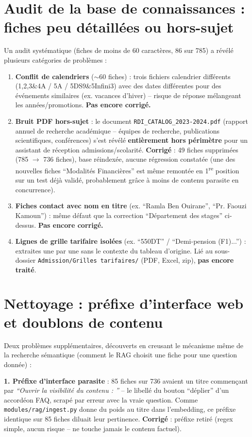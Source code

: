 \documentclass[11pt,a4paper]{report}
\begin{document}
\section{Audit de la base de connaissances : fiches peu détaillées ou hors-sujet}
Un audit systématique (fiches de moins de 60 caractères, 86 sur 785) a révélé plusieurs
catégories de problèmes :
\begin{enumerate}
    \item \textbf{Conflit de calendriers} ($\sim$60 fiches) : trois fichiers calendrier
    différents (1,2,3\&4A / 5A / 5DS9\&5Infini3) avec des dates différentes pour des
    événements similaires (ex. vacances d'hiver) -- risque de réponse mélangeant les
    années/promotions. \textbf{Pas encore corrigé.}
    \item \textbf{Bruit PDF hors-sujet} : le document \texttt{RDI\_CATALOG\_2023-2024.pdf}
    (rapport annuel de recherche académique -- équipes de recherche, publications
    scientifiques, conférences) s'est révélé \textbf{entièrement hors périmètre} pour un
    assistant de réception admissions/scolarité. \textbf{Corrigé} : 49 fiches supprimées
    (785 $\to$ 736 fiches), base réindexée, aucune régression constatée (une des
    nouvelles fiches ``Modalités Financières'' est même remontée en 1\textsuperscript{re}
    position sur un test déjà validé, probablement grâce à moins de contenu parasite en
    concurrence).
    \item \textbf{Fiches contact avec nom en titre} (ex. ``Ramla Ben Ouirane'', ``Pr.
    Faouzi Kamoun'') : même défaut que la correction ``Département des stages''
    ci-dessus. \textbf{Pas encore corrigé.}
    \item \textbf{Lignes de grille tarifaire isolées} (ex. ``550DT'' / ``Demi-pension
    (F1)...'') : extraites une par une sans le contexte du tableau d'origine. Lié au
    sous-dossier \texttt{Admission/Grilles tarifaires/} (PDF, Excel, zip), \textbf{pas
    encore traité}.
\end{enumerate}

\section{Nettoyage : préfixe d'interface web et doublons de contenu}
Deux problèmes supplémentaires, découverts en creusant le mécanisme même de la
recherche sémantique (comment le RAG choisit une fiche pour une question donnée) :

\textbf{1. Préfixe d'interface parasite} : 85 fiches sur 736 avaient un titre commençant
par \emph{``Ouvrir la visibilité du contenu : ''} -- le libellé du bouton ``déplier'' d'un
accordéon FAQ, scrapé par erreur avec la vraie question. Comme
\texttt{modules/rag/ingest.py} donne du poids au titre dans l'embedding, ce préfixe
identique sur 85 fiches diluait leur pertinence. \textbf{Corrigé} : préfixe retiré
(regex simple, aucun risque -- ne touche jamais le contenu factuel).
\end{document}
